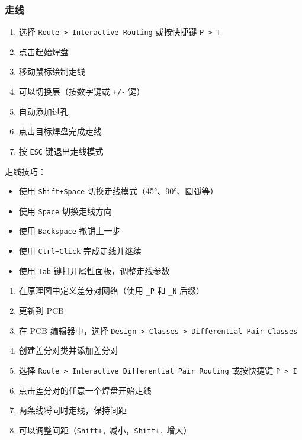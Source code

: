 \subsubsection{走线}


\begin{enumerate}
  \item 选择 \lstinline{Route > Interactive Routing} 或按快捷键 \lstinline{P > T}
  \item 点击起始焊盘
  \item 移动鼠标绘制走线
  \item 可以切换层（按数字键或 \lstinline{+/-} 键）
  \item 自动添加过孔
  \item 点击目标焊盘完成走线
  \item 按 \lstinline{ESC} 键退出走线模式
\end{enumerate}

走线技巧：

\begin{itemize}
  \item 使用 \lstinline{Shift+Space} 切换走线模式（45°、90°、圆弧等）
  \item 使用 \lstinline{Space} 切换走线方向
  \item 使用 \lstinline{Backspace} 撤销上一步
  \item 使用 \lstinline{Ctrl+Click} 完成走线并继续
  \item 使用 \lstinline{Tab} 键打开属性面板，调整走线参数
\end{itemize}


\begin{enumerate}
  \item 在原理图中定义差分对网络（使用 \lstinline{_P} 和 \lstinline{_N} 后缀）
  \item 更新到 PCB
  \item 在 PCB 编辑器中，选择 \lstinline{Design > Classes > Differential Pair Classes}
  \item 创建差分对类并添加差分对
  \item 选择 \lstinline{Route > Interactive Differential Pair Routing} 或按快捷键 \lstinline{P > I}
  \item 点击差分对的任意一个焊盘开始走线
  \item 两条线将同时走线，保持间距
  \item 可以调整间距（\lstinline{Shift+,} 减小，\lstinline{Shift+.} 增大）
\end{enumerate}


